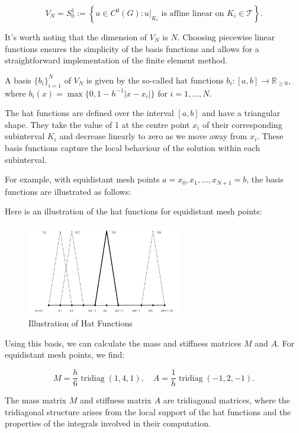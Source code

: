 \[
V_N = S^1_0 := \left\{u \in C^0(G): u|_{K_i} \text{ is affine linear on } K_i \in \mathcal{T}\right\}.
\]

It's worth noting that the dimension of $V_N$ is $N$. Choosing piecewise linear functions ensures the simplicity of the basis functions and allows for a straightforward implementation of the finite element method.

A basis $\{b_i\}_{i=1}^N$ of $V_N$ is given by the so-called hat functions $b_i: [a, b] \rightarrow \mathbb{R}_{\geq 0}$, where $b_i(x) = \max\{0, 1 - h^{-1}|x - x_i|\}$ for $i = 1, \ldots, N$. 

The hat functions are defined over the interval $[a, b]$ and have a triangular shape. They take the value of 1 at the centre point $x_i$ of their corresponding subinterval $K_i$ and decrease linearly to zero as we move away from $x_i$. These basis functions capture the local behaviour of the solution within each subinterval.

For example, with equidistant mesh points $a = x_0, x_1, \ldots, x_{N+1} = b$, the basis functions are illustrated as follows:

Here is an illustration of the hat functions for equidistant mesh points:

\begin{figure}[ht]
  \centering
  \includegraphics[width=0.6\textwidth]{pdes/fig/hat_functions.png}
  \caption{Illustration of Hat Functions}
\end{figure}

Using this basis, we can calculate the mass and stiffness matrices $M$ and $A$. For equidistant mesh points, we find:

\[
M = \frac{h}{6} \operatorname{tridiag}(1, 4, 1), \quad A = \frac{1}{h} \operatorname{tridiag}(-1, 2, -1).
\]

The mass matrix $M$ and stiffness matrix $A$ are tridiagonal matrices, where the tridiagonal structure arises from the local support of the hat functions and the properties of the integrals involved in their computation.